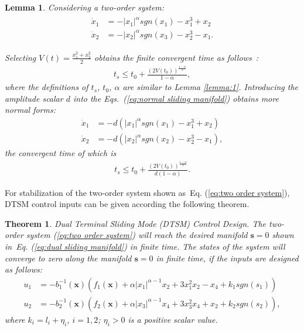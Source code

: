 \documentclass[3p]{elsarticle}
\theoremstyle{plain}
\newtheorem{mylem}{Lemma}
\newtheorem{mythm}{Theorem}
\theoremstyle{remark}
\begin{document}
\begin{mylem}
Considering a two-order system:
\begin{align}
\begin{split}
\dot x_1&=-\vert x_1\vert^\alpha sgn(x_1)-x_1^3+x_2\\
\dot x_2&=-\vert x_2\vert^\alpha sgn(x_3)-x_2^3-x_1.\label{eq:normal sliding manifold}
\end{split}
\end{align}\par
Selecting $V(t) = \frac{x_1^2+x_2^2}{2}$ obtains the finite convergent time as follows~\cite{moulay2006finite}:
\begin{align}
t_s\le t_0+\frac{(2V(t_0))^{\frac{1-\alpha}{2}}}{1-\alpha},
\end{align}
where the definitions of  $t_s$, $t_0$, $\alpha$ are similar to Lemma \ref{lemma:1}. Introducing the amplitude scalar $d$ into the Eqs.~(\ref{eq:normal sliding manifold}) obtains  more normal forms:
\begin{align}
\dot x_1&=-d(\vert x_1\vert^\alpha sgn(x_1)-x_1^3+x_2)\\
\dot x_2&=-d(\vert x_2\vert^\alpha sgn(x_2)-x_2^3-x_1),\label{eq:more normal sliding manifold}
\end{align}
the convergent time of which is
\begin{align}
t_s\le t_0+\frac{(2V(t_0))^{\frac{1-\alpha}{2}}}{d(1-\alpha)}.
\end{align}\label{lemma:2}
\end{mylem}
For stabilization of the two-order system shown as~Eq. (\ref{eq:two order system}), DTSM control inputs can be given according the following theorem.
\begin{mythm}\label{theorem:1}Dual Terminal Sliding Mode (DTSM) Control Design.
The two-order system (\ref{eq:two order system}) will reach the desired manifold $\bm s = 0$ shown in~Eq. (\ref{eq:dual sliding manifold}) in finite time. The states of the system will converge to zero along the manifold $\bm s=0$ in finite time, if the inputs are designed as follows:
\begin{align}
u_1 &= -b_1^{-1}(\bm x)(f_1(\bm x)+\alpha\vert x_1\vert^{\alpha-1}x_2+3x_1^2x_2-x_4+k_1sgn(s_1))\\
u_2 &= -b_2^{-1}(\bm x)(f_2(\bm x)+\alpha\vert x_3\vert^{\alpha-1}x_4+3x_3^2x_4+x_2+k_2sgn(s_2)),
\end{align}
where $k_i = l_i+\eta_i$, $i=1,2$; $\eta_i>0$ is a positive scalar value.
\end{mythm}
\end{document}
